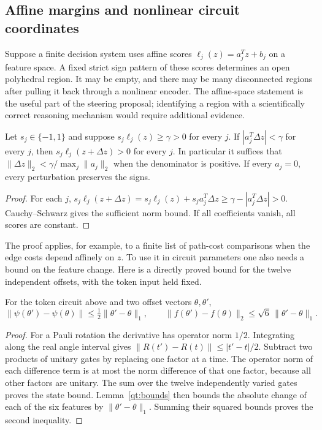 \subsection{Affine margins and nonlinear circuit coordinates}

Suppose a finite decision system uses affine scores
$\ell_j(z)=a_j^Tz+b_j$ on a feature space. A fixed strict sign pattern of
these scores determines an open polyhedral region. It may be empty, and
there may be many disconnected regions after pulling it back through a
nonlinear encoder. The affine-space statement is the useful part of the
steering proposal; identifying a region with a scientifically correct
reasoning mechanism would require additional evidence.

\begin{proposition}
\label{qt:margin}
Let $s_j\in\{-1,1\}$ and suppose
$s_j\ell_j(z)\geq\gamma>0$ for every $j$. If
$|a_j^T\Delta z|<\gamma$ for every $j$, then
$s_j\ell_j(z+\Delta z)>0$ for every $j$.
In particular it suffices that
$\|\Delta z\|_2<\gamma/\max_j\|a_j\|_2$ when the denominator is positive.
If every $a_j=0$, every perturbation preserves the signs.
\end{proposition}
\begin{proof}
For each $j$,
$s_j\ell_j(z+\Delta z)=s_j\ell_j(z)+s_j a_j^T\Delta z
\geq\gamma-|a_j^T\Delta z|>0$.
Cauchy--Schwarz gives the sufficient norm bound. If all coefficients
vanish, all scores are constant.
\end{proof}

The proof applies, for example, to a finite list of path-cost comparisons
when the edge costs depend affinely on $z$. To use it in circuit parameters
one also needs a bound on the feature change. Here is a directly proved
bound for the twelve independent offsets, with the token input held fixed.

\begin{lemma}
\label{qt:circuit-lipschitz}
For the token circuit above and two offset vectors $\theta,\theta'$,
\[
 \|\psi(\theta')-\psi(\theta)\|
 \leq\tfrac12\|\theta'-\theta\|_1,
 \qquad
 \|f(\theta')-f(\theta)\|_2
 \leq\sqrt6\,\|\theta'-\theta\|_1.
\]
\end{lemma}
\begin{proof}
For a Pauli rotation the derivative has operator norm $1/2$.
Integrating along the real angle interval gives
$\|R(t')-R(t)\|\leq|t'-t|/2$.
Subtract two products of unitary gates by replacing one factor at a time.
The operator norm of each difference term is at most the norm difference
of that one factor, because all other factors are unitary. The sum over
the twelve independently varied gates proves the state bound.
Lemma~\ref{qt:bounds} then bounds the absolute change of each of the six
features by $\|\theta'-\theta\|_1$. Summing their squared bounds proves
the second inequality.
\end{proof}

